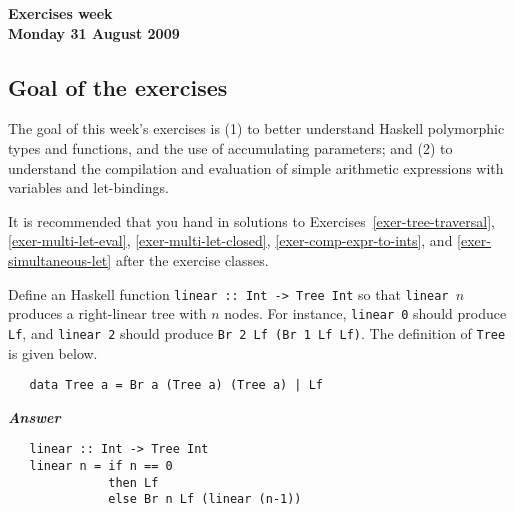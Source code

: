 \documentclass[a4paper]{article}
\begin{document}
\begin{center}
{\Large\bf Exercises week \\[1ex]
Monday 31 August 2009}\\[1ex]
\end{center}

\subsection*{Goal of the exercises}

The goal of this week's exercises is (1) to better understand Haskell
polymorphic types and functions, and the use of accumulating
parameters; and (2) to understand the compilation and evaluation of
simple arithmetic expressions with variables and let-bindings.


\noindent 
It is recommended that you hand in solutions to
Exercises~\ref{exer-tree-traversal}, \ref{exer-multi-let-eval},
\ref{exer-multi-let-closed}, \ref{exer-comp-expr-to-ints}, and
\ref{exer-simultaneous-let} after the exercise classes.  


\begin{exercise}\label{exer-right-linear}
  Define an Haskell function \texttt{linear ::\ Int -> Tree Int} so that
  \texttt{linear $n$} produces a right-linear tree with $n$ nodes.
  For instance, \texttt{linear 0} should produce \texttt{Lf}, and
  \texttt{linear 2} should produce \texttt{Br 2 Lf (Br 1 Lf Lf)}.  The definition
  of \texttt{Tree} is given below.
{\codesetup\begin{verbatim}
   data Tree a = Br a (Tree a) (Tree a) | Lf
\end{verbatim}}
\noindent
\textbf{\emph{Answer}}
{\codesetup\begin{verbatim}
   linear :: Int -> Tree Int
   linear n = if n == 0
              then Lf 
              else Br n Lf (linear (n-1))
\end{verbatim}}

\end{exercise}
\end{document}

